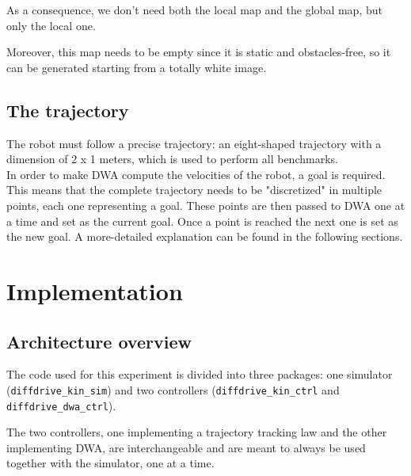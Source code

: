 \documentclass[11pt,a4paper]{article}
\begin{document}
As a consequence, we don't need both the local map and the global map, but only the local one.

Moreover, this map needs to be empty since it is static and obstacles-free, so it can be
generated starting from a totally white image.



\subsection{The trajectory}

The robot must follow a precise trajectory: an eight-shaped trajectory with a dimension of 2 x 1 meters,
which is used to perform all benchmarks.\\

In order to make DWA compute the velocities of the robot, a goal is required.
This means that the complete trajectory needs to be "discretized" in multiple points, each one representing a goal.
These points are then passed to DWA one at a time and set as the current goal.
Once a point is reached the next one is set as the new goal.
A more-detailed explanation can be found in the following sections.





\section{Implementation}



\subsection{Architecture overview}

The code used for this experiment is divided into three packages: one simulator (\texttt{diffdrive\_kin\_sim})
and two controllers (\texttt{diffdrive\_kin\_ctrl} and \texttt{diffdrive\_dwa\_ctrl}).

The two controllers, one implementing a trajectory tracking law and the other implementing DWA,
are interchangeable and are meant to always be used together with the simulator, one at a time.
\end{document}

